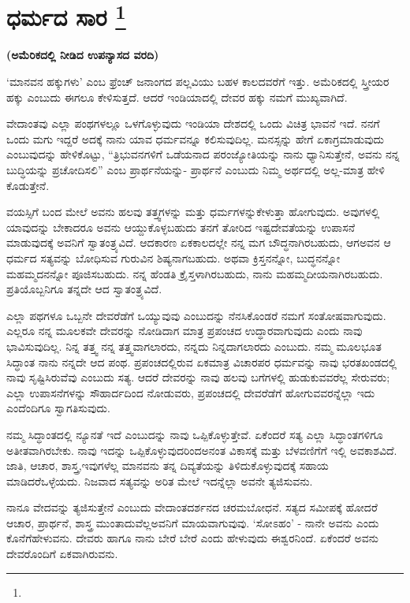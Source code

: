 
\vspace{-0.8cm}

\chapter[ಧರ್ಮದ ಸಾರ ]{ಧರ್ಮದ ಸಾರ \protect\footnote{}}

\centerline{\textbf{(ಅಮೆರಿಕದಲ್ಲಿ ನೀಡಿದ ಉಪನ್ಯಾಸದ ವರದಿ)}}

‘ಮಾನವನ ಹಕ್ಕುಗಳು’ ಎಂಬ ಫ್ರೆಂಚ್​ ಜನಾಂಗದ ಪಲ್ಲವಿಯು ಬಹಳ ಕಾಲದವರೆಗೆ ಇತ್ತು. ಅಮೆರಿಕದಲ್ಲಿ ಸ್ತ್ರೀಯರ ಹಕ್ಕು ಎಂಬುದು ಈಗಲೂ ಕೇಳಿಸುತ್ತದೆ. ಆದರೆ ಇಂಡಿಯಾದಲ್ಲಿ ದೇವರ ಹಕ್ಕು ನಮಗೆ ಮುಖ್ಯವಾಗಿದೆ.

ವೇದಾಂತವು ಎಲ್ಲಾ ಪಂಥಗಳಲ್ಲೂ ಒಳಗೊಳ್ಳುವುದು ಇಂಡಿಯಾ ದೇಶದಲ್ಲಿ ಒಂದು ವಿಚಿತ್ರ ಭಾವನೆ ಇದೆ. ನನಗೆ ಒಂದು ಮಗು ಇದ್ದರೆ ಅದಕ್ಕೆ ನಾನು ಯಾವ ಧರ್ಮವನ್ನೂ ಕಲಿಸುವುದಿಲ್ಲ. ಮನಸ್ಸನ್ನು ಹೇಗೆ ಏಕಾಗ್ರಮಾಡುವುದು ಎಂಬುವುದನ್ನು ಹೇಳಿಕೊಟ್ಟು, “ತ್ರಿಭುವನಗಳಿಗೆ ಒಡೆಯನಾದ ಪರಂಜ್ಯೋತಿಯನ್ನು ನಾನು ಧ್ಯಾನಿಸುತ್ತೇನೆ, ಅವನು ನನ್ನ ಬುದ್ಧಿಯನ್ನು ಪ್ರಚೋದಿಸಲಿ” ಎಂಬ ಪ್ರಾರ್ಥನೆಯನ್ನು- ಪ್ರಾರ್ಥನೆ ಎಂಬುದು ನಿಮ್ಮ ಅರ್ಥದಲ್ಲಿ ಅಲ್ಲ-ಮಾತ್ರ ಹೇಳಿ ಕೊಡುತ್ತೇನೆ.

ವಯಸ್ಸಿಗೆ ಬಂದ ಮೇಲೆ ಅವನು ಹಲವು ತತ್ತ್ವಗಳನ್ನು ಮತ್ತು ಧರ್ಮಗಳನ್ನು\break ಕೇಳುತ್ತಾ ಹೋಗುವುದು. ಅವುಗಳಲ್ಲಿ ಯಾವುದನ್ನು ಬೇಕಾದರೂ ಅವನು ಆಯ್ದುಕೊಳ್ಳ\-ಬಹುದು ತನಗೆ ತೋರಿದ ಇಷ್ಟದೇವತೆಯನ್ನು ಉಪಾಸನೆ ಮಾಡುವುದಕ್ಕೆ ಅವನಿಗೆ ಸ್ವಾತಂತ್ರ್ಯವಿದೆ. ಆದಕಾರಣ ಏಕಕಾಲದಲ್ಲೇ ನನ್ನ ಮಗ ಬೌದ್ಧನಾಗಿರಬಹುದು, ಆಗ\break ಅವನ ಆ ಧರ್ಮದ ಸತ್ಯವನ್ನು ಬೋಧಿಸುವ ಗುರುವಿನ ಶಿಷ್ಯನಾಗಬಹುದು. ಅಥವಾ ಕ್ರಿಸ್ತನನ್ನೋ, ಬುದ್ಧನನ್ನೋ ಮಹಮ್ಮದನನ್ನೋ ಪೂಜಿಸಬಹುದು. ನನ್ನ ಹೆಂಡತಿ ಕ್ರೈಸ್ತಳಾಗಿರ\break ಬಹುದು, ನಾನು ಮಹಮ್ಮದೀಯನಾಗಿರಬಹುದು. ಪ್ರತಿಯೊಬ್ಬನಿಗೂ ತನ್ನದೇ ಆದ ಸ್ವಾತಂತ್ರ್ಯವಿದೆ.

ಎಲ್ಲಾ ಪಥಗಳೂ ಒಬ್ಬನೇ ದೇವರೆಡೆಗೆ ಒಯ್ಯುವುವು ಎಂಬುದನ್ನು ನೆನಸಿಕೊಂಡರೆ ನಮಗೆ ಸಂತೋಷವಾಗುವುದು. ಎಲ್ಲರೂ ನನ್ನ ಮೂಲಕವೇ ದೇವರನ್ನು ನೋಡಿದಾಗ ಮಾತ್ರ ಪ್ರಪಂಚದ ಉದ್ಧಾರವಾಗುವುದು ಎಂದು ನಾವು ಭಾವಿಸುವುದಿಲ್ಲ. ನಿನ್ನ ತತ್ತ್ವ ನನ್ನ ತತ್ತ್ವವಾಗಲಾರದು, ನನ್ನದು ನಿನ್ನದಾಗಲಾರದು ಎಂಬುದು. ನಮ್ಮ ಮೂಲಭೂತ ಸಿದ್ಧಾಂತ ನಾನು ನನ್ನದೇ ಆದ ಪಂಥ. ಪ್ರಪಂಚದಲ್ಲಿರುವ ಏಕಮಾತ್ರ ವಿಚಾರಪರ ಧರ್ಮವನ್ನು ನಾವು ಭರತಖಂಡದಲ್ಲಿ ನಾವು ಸೃಷ್ಟಿಸಿರುವೆವು ಎಂಬುದು ಸತ್ಯ. ಆದರೆ ದೇವರನ್ನು ನಾವು ಹಲವು ಬಗೆಗಳಲ್ಲಿ ಹುಡುಕುವವರೆಲ್ಲ ಸೇರುವರು; ಎಲ್ಲಾ ಉಪಾಸನೆಗಳನ್ನು ಸೌಹಾರ್ದದಿಂದ ನೋಡುವರು, ಪ್ರಪಂಚದಲ್ಲಿ ದೇವರೆಡೆಗೆ ಹೋಗುವವರನ್ನೆಲ್ಲಾ ಇದು ಎಂದೆಂದಿಗೂ ಸ್ವಾಗತಿಸುವುದು.

ನಮ್ಮ ಸಿದ್ಧಾಂತದಲ್ಲಿ ನ್ಯೂನತೆ ಇದೆ ಎಂಬುದನ್ನು ನಾವು ಒಪ್ಪಿಕೊಳ್ಳುತ್ತೇವೆ. ಏಕೆಂದರೆ ಸತ್ಯ ಎಲ್ಲಾ ಸಿದ್ಧಾಂತಗಳಿಗೂ ಅತೀತವಾಗಿರಬೇಕು. ನಾವು ಇದನ್ನು ಒಪ್ಪಿಕೊಳ್ಳುವುದರಿಂದ\break ಅನಂತ ವಿಕಾಸಕ್ಕೆ ಮತ್ತು ಬೆಳವಣಿಗೆಗೆ ಇಲ್ಲಿ ಅವಕಾಶವಿದೆ. ಜಾತಿ, ಆಚಾರ, ಶಾಸ್ತ್ರ,\break ಇವುಗಳೆಲ್ಲ ಮಾನವನು ತನ್ನ ದಿವ್ಯತೆಯನ್ನು ತಿಳಿದುಕೊಳ್ಳುವುದಕ್ಕೆ ಸಹಾಯ ಮಾಡಿದರೆ\break ಒಳ್ಳೆಯದು. ನಿಜವಾದ ಸತ್ಯವನ್ನು ಅರಿತ ಮೇಲೆ ಇದನ್ನೆಲ್ಲಾ ಅವನೇ ತ್ಯಜಿಸುವನು.

ನಾನೂ ವೇದವನ್ನು ತ್ಯಜಿಸುತ್ತೇನೆ ಎಂಬುದು ವೇದಾಂತದರ್ಶನದ ಚರಮ\break ಬೋಧನೆ. ಸತ್ಯದ ಸಮೀಪಕ್ಕೆ ಹೋದರೆ ಆಚಾರ, ಪ್ರಾರ್ಥನೆ, ಶಾಸ್ತ್ರ ಮುಂತಾದುವೆಲ್ಲ\break ಅವನಿಗೆ ಮಾಯವಾಗುವುವು. ‘ಸೋಽಹಂ’ - ನಾನೇ ಅವನು ಎಂದು ಕೊನೆಗೆ\break ಹೇಳುವನು. ದೇವರು ಹಾಗೂ ನಾನು ಬೇರೆ ಬೇರೆ ಎಂದು ಹೇಳುವುದು ಈಶ್ವರನಿಂದೆ. ಏಕೆಂದರೆ ಅವನು ದೇವರೊಂದಿಗೆ ಏಕವಾಗಿರುವನು.

